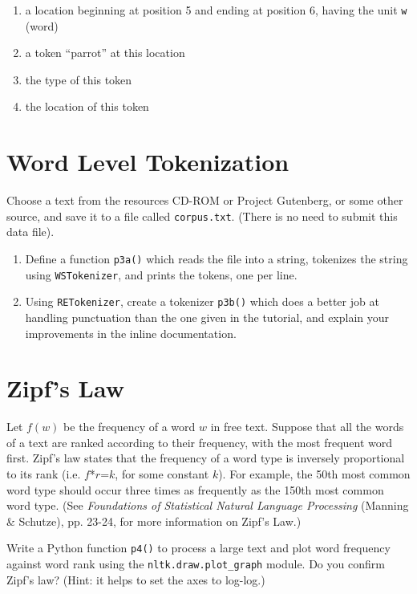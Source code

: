 \documentclass{cis530}
\begin{document}
\begin{enumerate}
    \item a location beginning at position 5 and ending at position 6,
      having the unit \texttt{w} (word)
    \item a token ``parrot'' at this location
    \item the type of this token
    \item the location of this token
\end{enumerate}

\section{Word Level Tokenization}

Choose a text from the resources CD-ROM or Project Gutenberg, or some other
source, and save it to a file called \texttt{corpus.txt}.  (There is no need
to submit this data file).

\begin{enumerate}
    \item Define a function \texttt{p3a()} which reads the file into a
      string, tokenizes the string using \texttt{WSTokenizer},
      and prints the tokens, one per line.
    \item Using \texttt{RETokenizer}, create a tokenizer \texttt{p3b()}
      which does a better
      job at handling punctuation than the one given in the tutorial, and
      explain your improvements in the inline documentation.
\end{enumerate}

\section{Zipf's Law}

Let $f(w)$ be the frequency of a word $w$ in free text.  Suppose that
all the words of a text are ranked according to their frequency, with
the most frequent word first.
Zipf's law states that the frequency of a word type is inversely
proportional to its rank (i.e. $f$*$r$=$k$, for some constant $k$).
For example, the 50th most common word type should
occur three times as frequently as the 150th most common word type.
(See \emph{Foundations of Statistical Natural Language Processing}
(Manning \& Schutze), pp. 23-24, for more information on Zipf's Law.)

Write a Python function \texttt{p4()}
to process a large text and plot word frequency
against word rank using the \texttt{nltk.draw.plot\_graph} module.
Do you confirm Zipf's law?  (Hint: it helps to
set the axes to log-log.)
\end{document}
